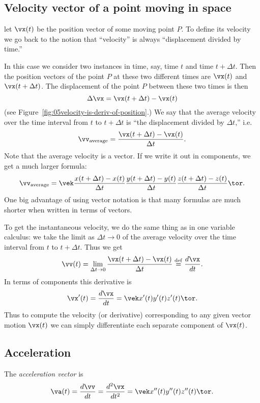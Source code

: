 \subsection{Velocity vector of a point moving in space} %
\label{sec:velocity-of-vector-motion}
let $\vx(t)$ be the position vector of some moving point $P$.  To
define its velocity we go back to the notion that ``velocity'' is
always ``displacement divided by time.''

In this case we consider two instances in time, say, time $t$ and time
$t+ \Delta t$.  Then the position vectors of the point $P$ at these
two different times are $\vx(t)$ and $\vx(t+\Delta t)$.  The
displacement of the point $P$ between these two times is then
\[
\Delta \vx = \vx(t+\Delta t) - \vx(t)
\]
(see Figure~\ref{fig:05velocity-is-deriv-of-position}.)  We say that
the average velocity over the time interval from $t$ to $t+\Delta t$
is ``the displacement divided by $\Delta t$,'' i.e.
\[
\vv_{\rm average} = \frac{\vx(t+\Delta t) - \vx(t)}{\Delta t}.
\]
Note that the average velocity is a vector.  If we write it out in
components, we get a much larger formula:
\[
\vv_{\rm average} = \vek
\dfrac{x(t+\Delta t) - x(t)}{\Delta t} \\[2ex]
\dfrac{y(t+\Delta t) - y(t)}{\Delta t} \\[2ex]
\dfrac{z(t+\Delta t) - z(t)}{\Delta t} \tor.
\]
One big advantage of using vector notation is that many formulas are
much shorter when written in terms of vectors.

To get the instantaneous velocity, we do the same thing as in one
variable calculus: we take the limit as $\Delta t\to0$ of the average
velocity over the time interval from $t$ to $t+\Delta t$.  Thus we get
\begin{equation}
  \vv(t) = \lim_{\Delta t\to0} \frac{\vx(t+\Delta t) - \vx(t)}{\Delta t}
  \stackrel{\rm def}=
  \frac{d\vx}{dt}.
  \label{eq:velocity-of-vector-motion}
\end{equation}
In terms of components this derivative is
\[
\vx'(t)= \frac{d\vx}{dt} = \vek x'(t) \\ y'(t) \\ z'(t) \tor.
\]
Thus to compute the velocity (or derivative) corresponding to any
given vector motion $\vx(t)$ we can simply differentiate each separate
component of $\vx(t)$.

\subsection{Acceleration} %
The \emph{acceleration vector} is
\[
\va(t)
= \frac{d\vv}{dt}
= \frac{d^2\vx} {dt^2} = \vek x''(t)\\ y''(t) \\ z''(t) \tor.
\]


